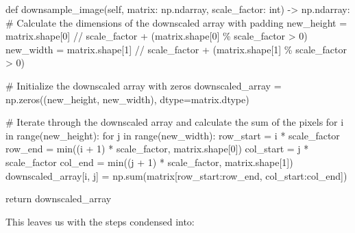 \documentclass[
]{article}
\newenvironment{Shaded}{\begin{snugshade}}{\end{snugshade}}
\newcommand{\BuiltInTok}[1]{\textcolor[rgb]{0.00,0.23,0.31}{#1}}
\newcommand{\CommentTok}[1]{\textcolor[rgb]{0.37,0.37,0.37}{#1}}
\newcommand{\ControlFlowTok}[1]{\textcolor[rgb]{0.00,0.23,0.31}{#1}}
\newcommand{\DecValTok}[1]{\textcolor[rgb]{0.68,0.00,0.00}{#1}}
\newcommand{\KeywordTok}[1]{\textcolor[rgb]{0.00,0.23,0.31}{#1}}
\newcommand{\NormalTok}[1]{\textcolor[rgb]{0.00,0.23,0.31}{#1}}
\newcommand{\OperatorTok}[1]{\textcolor[rgb]{0.37,0.37,0.37}{#1}}
\newcommand{\VariableTok}[1]{\textcolor[rgb]{0.07,0.07,0.07}{#1}}
\begin{document}
\begin{Shaded}
\begin{Highlighting}[]
 \KeywordTok{def}\NormalTok{ downsample\_image(}\VariableTok{self}\NormalTok{, matrix: np.ndarray, scale\_factor: }\BuiltInTok{int}\NormalTok{) }\OperatorTok{{-}\textgreater{}}\NormalTok{ np.ndarray:}
    \CommentTok{\# Calculate the dimensions of the downscaled array with padding}
\NormalTok{  new\_height }\OperatorTok{=}\NormalTok{ matrix.shape[}\DecValTok{0}\NormalTok{] }\OperatorTok{//}\NormalTok{ scale\_factor }\OperatorTok{+}\NormalTok{ (matrix.shape[}\DecValTok{0}\NormalTok{] }\OperatorTok{\%}\NormalTok{ scale\_factor }\OperatorTok{\textgreater{}} \DecValTok{0}\NormalTok{)}
\NormalTok{  new\_width }\OperatorTok{=}\NormalTok{ matrix.shape[}\DecValTok{1}\NormalTok{] }\OperatorTok{//}\NormalTok{ scale\_factor }\OperatorTok{+}\NormalTok{ (matrix.shape[}\DecValTok{1}\NormalTok{] }\OperatorTok{\%}\NormalTok{ scale\_factor }\OperatorTok{\textgreater{}} \DecValTok{0}\NormalTok{)}

  \CommentTok{\# Initialize the downscaled array with zeros}
\NormalTok{  downscaled\_array }\OperatorTok{=}\NormalTok{ np.zeros((new\_height, new\_width), dtype}\OperatorTok{=}\NormalTok{matrix.dtype)}

  \CommentTok{\# Iterate through the downscaled array and calculate the sum of the pixels}
  \ControlFlowTok{for}\NormalTok{ i }\KeywordTok{in} \BuiltInTok{range}\NormalTok{(new\_height):}
    \ControlFlowTok{for}\NormalTok{ j }\KeywordTok{in} \BuiltInTok{range}\NormalTok{(new\_width):}
\NormalTok{      row\_start }\OperatorTok{=}\NormalTok{ i }\OperatorTok{*}\NormalTok{ scale\_factor}
\NormalTok{      row\_end }\OperatorTok{=} \BuiltInTok{min}\NormalTok{((i }\OperatorTok{+} \DecValTok{1}\NormalTok{) }\OperatorTok{*}\NormalTok{ scale\_factor, matrix.shape[}\DecValTok{0}\NormalTok{])}
\NormalTok{      col\_start }\OperatorTok{=}\NormalTok{ j }\OperatorTok{*}\NormalTok{ scale\_factor}
\NormalTok{      col\_end }\OperatorTok{=} \BuiltInTok{min}\NormalTok{((j }\OperatorTok{+} \DecValTok{1}\NormalTok{) }\OperatorTok{*}\NormalTok{ scale\_factor, matrix.shape[}\DecValTok{1}\NormalTok{])}
\NormalTok{      downscaled\_array[i, j] }\OperatorTok{=}\NormalTok{ np.}\BuiltInTok{sum}\NormalTok{(matrix[row\_start:row\_end, col\_start:col\_end])}

  \ControlFlowTok{return}\NormalTok{ downscaled\_array}
\end{Highlighting}
\end{Shaded}

This leaves us with the steps condensed into:
\end{document}
